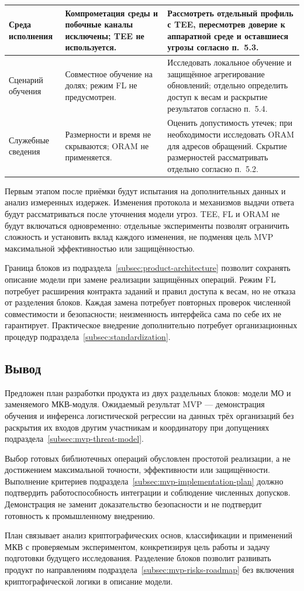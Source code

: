 {\begin{longtable}{|P{0.23\tablecontentwidth}|P{0.34\tablecontentwidth}|P{0.43\tablecontentwidth}|}
\hline
Среда исполнения & Компрометация среды и побочные каналы исключены; TEE не используется. & Рассмотреть отдельный профиль с TEE, пересмотрев доверие к аппаратной среде и оставшиеся угрозы согласно п.~5.3. \\
\hline
Сценарий обучения & Совместное обучение на долях; режим FL не предусмотрен. & Исследовать локальное обучение и защищённое агрегирование обновлений; отдельно определить доступ к весам и раскрытие результатов согласно п.~5.4. \\
\hline
Служебные сведения & Размерности и время не скрываются; ORAM не применяется. & Оценить допустимость утечек; при необходимости исследовать ORAM для адресов обращений. Скрытие размерностей рассматривать отдельно согласно п.~5.2. \\
\hline
\end{longtable}
}

Первым этапом после приёмки будут испытания на дополнительных данных и анализ измеренных издержек. Изменения протокола и механизмов выдачи ответа будут рассматриваться после уточнения модели угроз. TEE, FL и ORAM не будут включаться одновременно: отдельные эксперименты позволят ограничить сложность и установить вклад каждого изменения, не подменяя цель MVP максимальной эффективностью или защищённостью.

Граница блоков из подраздела~\ref{subsec:product-architecture} позволит сохранять описание модели при замене реализации защищённых операций. Режим FL потребует расширения контракта заданий и правил доступа к весам, но не отказа от разделения блоков. Каждая замена потребует повторных проверок численной совместимости и безопасности; неизменность интерфейса сама по себе их не гарантирует. Практическое внедрение дополнительно потребует организационных процедур подраздела~\ref{subsec:standardization}.

\subsection{Вывод}
\label{subsec:mvp-conclusion}

Предложен план разработки продукта из двух раздельных блоков: модели МО и заменяемого МКВ-модуля. Ожидаемый результат MVP --- демонстрация обучения и инференса логистической регрессии на данных трёх организаций без раскрытия их входов другим участникам и координатору при допущениях подраздела~\ref{subsec:mvp-threat-model}.

Выбор готовых библиотечных операций обусловлен простотой реализации, а не достижением максимальной точности, эффективности или защищённости. Выполнение критериев подраздела~\ref{subsec:mvp-implementation-plan} должно подтвердить работоспособность интеграции и соблюдение численных допусков. Демонстрация не заменит доказательство безопасности и не подтвердит готовность к промышленному внедрению.

План связывает анализ криптографических основ, классификации и применений МКВ с проверяемым экспериментом, конкретизируя цель работы и задачу подготовки будущего исследования. Разделение блоков позволит развивать продукт по направлениям подраздела~\ref{subsec:mvp-risks-roadmap} без включения криптографической логики в описание модели.
